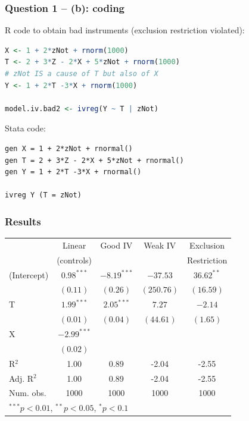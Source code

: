 \documentclass[xcolor=table,dvipsnames]{beamer}
\begin{document}
\begin{frame}[fragile]
\frametitle{Question 1 -- (b): coding}
R code to obtain bad instruments (exclusion restriction violated):
\begin{lstlisting}[language=R]
X <- 1 + 2*zNot + rnorm(1000)
T <- 2 + 3*Z - 2*X + 5*zNot + rnorm(1000) 
# zNot IS a cause of T but also of X 
Y <- 1 + 2*T -3*X + rnorm(1000)

model.iv.bad2 <- ivreg(Y ~ T | zNot)
\end{lstlisting}

Stata code:
\begin{lstlisting}
gen X = 1 + 2*zNot + rnormal()
gen T = 2 + 3*Z - 2*X + 5*zNot + rnormal()
gen Y = 1 + 2*T -3*X + rnormal()

ivreg Y (T = zNot)
\end{lstlisting}
\end{frame}

\begin{frame}
\frametitle{Results}
\begin{table}
\begin{center}
\begin{tabular}{l c c c c }
\hline
 & Linear  & Good IV & Weak IV & Exclusion \\
 & (controls)		&		   &		 & Restriction \\
\hline
(Intercept) & $0.98^{***}$  & $-8.19^{***}$ & $-37.53$   & $36.62^{**}$ \\
            & $(0.11)$      & $(0.26)$      & $(250.76)$ & $(16.59)$    \\
T           & $1.99^{***}$  & $2.05^{***}$  & $7.27$     & $-2.14$      \\
            & $(0.01)$      & $(0.04)$      & $(44.61)$  & $(1.65)$     \\
X           & $-2.99^{***}$ &               &            &              \\
            & $(0.02)$      &               &            &              \\
\hline
R$^2$       & 1.00          & 0.89          & -2.04      & -2.55        \\
Adj. R$^2$  & 1.00          & 0.89          & -2.04      & -2.55        \\
Num. obs.   & 1000          & 1000          & 1000       & 1000         \\
\hline
\multicolumn{5}{l}{\scriptsize{$^{***}p<0.01$, $^{**}p<0.05$, $^*p<0.1$}}
\end{tabular}
\end{center}
\end{table}
\end{frame}
\end{document}
